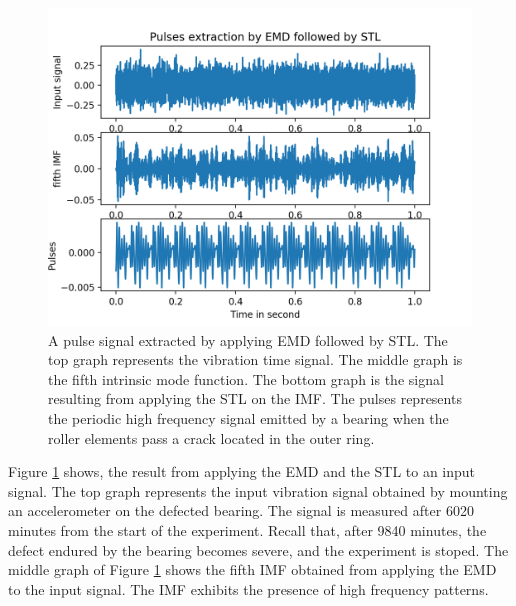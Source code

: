 \documentclass[../Main/thesis.tex]{subfiles}
\begin{document}
\begin{figure}[H] %
   \centering
   \includegraphics[width=6in]{../fig/emd-stl.png} 
   \caption{ A pulse signal extracted by applying EMD followed by STL. The top graph represents the vibration time signal. The middle graph is the fifth intrinsic mode function. The bottom graph is the signal resulting from applying the STL on the IMF. The pulses represents the periodic high frequency signal emitted by a bearing when the roller elements pass a crack located in the outer ring.}
   \label{fig:emd-stl}
\end{figure}
\justify
Figure \ref{fig:emd-stl} shows, the result from applying the EMD and the STL to an input signal. The top graph represents the input vibration signal obtained by mounting an accelerometer on the defected bearing. The signal is measured after 6020 minutes from the start of the experiment. Recall that, after 9840 minutes, the defect endured by the bearing becomes severe, and the experiment is stoped. The middle graph of Figure \ref{fig:emd-stl} shows the fifth IMF obtained from applying the EMD to the input signal. The IMF exhibits the presence of high frequency patterns.
\end{document}
